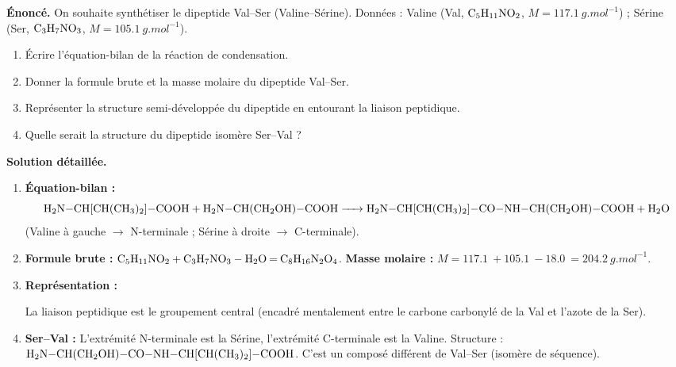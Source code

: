 \documentclass[11pt]{article}
\begin{document}
\begin{exoresolu}
\textbf{Énoncé.} On souhaite synthétiser le dipeptide Val–Ser (Valine–Sérine).
Données : Valine (Val, $\ce{C5H11NO2}$, $M=\SI{117,1}{g.mol^{-1}}$) ; Sérine (Ser, $\ce{C3H7NO3}$, $M=\SI{105,1}{g.mol^{-1}}$).
\begin{enumerate}
    \item Écrire l'équation-bilan de la réaction de condensation.
    \item Donner la formule brute et la masse molaire du dipeptide Val–Ser.
    \item Représenter la structure semi-développée du dipeptide en entourant la liaison peptidique.
    \item Quelle serait la structure du dipeptide isomère Ser–Val ?
\end{enumerate}

\textbf{Solution détaillée.}
\begin{enumerate}
    \item \textbf{Équation-bilan :}
    \[
    \ce{H2N-CH[CH(CH3)2]-COOH + H2N-CH(CH2OH)-COOH -> H2N-CH[CH(CH3)2]-CO-NH-CH(CH2OH)-COOH + H2O}
    \]
    (Valine à gauche $\rightarrow$ N-terminale ; Sérine à droite $\rightarrow$ C-terminale).
    \item \textbf{Formule brute :} $\ce{C5H11NO2 + C3H7NO3 - H2O = C8H16N2O4}$.
    \textbf{Masse molaire :} $M = \SI{117,1}{} + \SI{105,1}{} - \SI{18,0}{} = \SI{204,2}{g.mol^{-1}}$.
    \item \textbf{Représentation :}
    \begin{center}
    \end{center}
    La liaison peptidique est le groupement  central (encadré mentalement entre le carbone carbonylé de la Val et l'azote de la Ser).
    \item \textbf{Ser–Val :} L'extrémité N-terminale est la Sérine, l'extrémité C-terminale est la Valine.
    Structure : $\ce{H2N-CH(CH2OH)-CO-NH-CH[CH(CH3)2]-COOH}$.
    C'est un composé différent de Val–Ser (isomère de séquence).
\end{enumerate}
\end{exoresolu}
\end{document}
